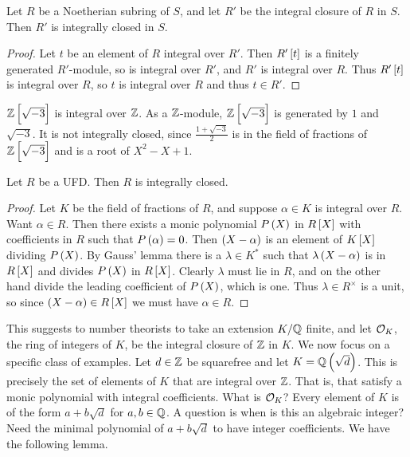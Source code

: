 
\begin{lemma}
Let $ R $ be a Noetherian subring of $ S $, and let $ R' $ be the integral closure of $ R $ in $ S $. Then $ R' $ is integrally closed in $ S $.
\end{lemma}

\begin{proof}
Let $ t $ be an element of $ R $ integral over $ R' $. Then $ R'\sbr{t} $ is a finitely generated $ R' $-module, so is integral over $ R' $, and $ R' $ is integral over $ R $. Thus $ R'\sbr{t} $ is integral over $ R $, so $ t $ is integral over $ R $ and thus $ t \in R' $.
\end{proof}

\begin{example*}
$ \ZZ\sbr{\sqrt{-3}} $ is integral over $ \mathbb{Z} $. As a $ \mathbb{Z} $-module, $ \ZZ\sbr{\sqrt{-3}} $ is generated by $ 1 $ and $ \sqrt{-3} $. It is not integrally closed, since $ \tfrac{1 + \sqrt{-3}}{2} $ is in the field of fractions of $ \ZZ\sbr{\sqrt{-3}} $ and is a root of $ X^2 - X + 1 $.
\end{example*}

\begin{theorem}
Let $ R $ be a UFD. Then $ R $ is integrally closed.
\end{theorem}

\begin{proof}
Let $ K $ be the field of fractions of $ R $, and suppose $ \alpha \in K $ is integral over $ R $. Want $ \alpha \in R $. Then there exists a monic polynomial $ P\br{X} $ in $ R\sbr{X} $ with coefficients in $ R $ such that $ P\br{\alpha} = 0 $. Then $ \br{X - \alpha} $ is an element of $ K\sbr{X} $ dividing $ P\br{X} $. By Gauss' lemma there is a $ \lambda \in K^* $ such that $ \lambda\br{X - \alpha} $ is in $ R\sbr{X} $ and divides $ P\br{X} $ in $ R\sbr{X} $. Clearly $ \lambda $ must lie in $ R $, and on the other hand divide the leading coefficient of $ P\br{X} $, which is one. Thus $ \lambda \in R^\times $ is a unit, so since $ \br{X - \alpha} \in R\sbr{X} $ we must have $ \alpha \in R $.
\end{proof}

This suggests to number theorists to take an extension $ K / \mathbb{Q} $ finite, and let $ \mathcal{O}_K $, the ring of integers of $ K $, be the integral closure of $ \mathbb{Z} $ in $ K $. We now focus on a specific class of examples. Let $ d \in \mathbb{Z} $ be squarefree and let $ K = \QQ\br{\sqrt{d}} $. This is precisely the set of elements of $ K $ that are integral over $ \mathbb{Z} $. That is, that satisfy a monic polynomial with integral coefficients. What is $ \mathcal{O}_K $? Every element of $ K $ is of the form $ a + b\sqrt{d} $ for $ a, b \in \mathbb{Q} $. A question is when is this an algebraic integer? Need the minimal polynomial of $ a + b\sqrt{d} $ to have integer coefficients. We have the following lemma.

